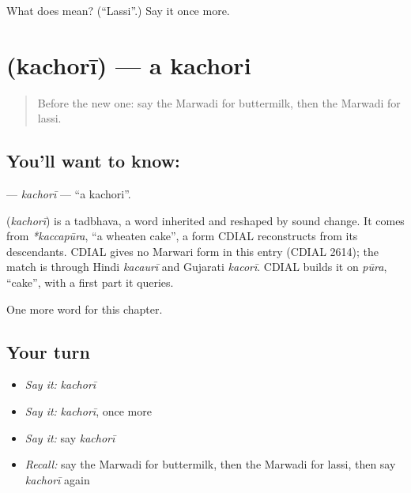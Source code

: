 \begin{tcolorbox}[breakable,colback=teal!4,colframe=teal!35!black,title={Before you move on}]
What does  mean? (\textquotedblleft{}Lassi\textquotedblright{}.) Say it once more.
\end{tcolorbox}
\section[\texorpdfstring{\mw{कचोरी} (kachorī)}{कचोरी (kachorī)}]{ (kachorī) — a kachori}

\label{lesson:MW-C134-kachori}



\begin{quote}
Before the new one: say the Marwadi for buttermilk, then the Marwadi for lassi.
\end{quote}

\subsection*{You'll want to know: }
\textbf{} — \emph{kachorī} — \textquotedblleft{}a kachori\textquotedblright{}.

\begin{cousinweb}
\textbf{} (\emph{kachorī}) is a tadbhava, a word inherited and reshaped by sound change. It comes from \emph{*kaccapūra}, \textquotedblleft{}a wheaten cake\textquotedblright{}, a form CDIAL reconstructs from its descendants. CDIAL gives no Marwari form in this entry (CDIAL 2614); the match is through Hindi \emph{kacaurī} and Gujarati \emph{kacorī}. CDIAL builds it on \emph{pūra}, \textquotedblleft{}cake\textquotedblright{}, with a first part it queries.
\end{cousinweb}

\begin{grammarlens}[title={What you've built}]
One more word for this chapter.
\end{grammarlens}

\subsection*{Your turn}
\begin{itemize}
\raggedright
  \item \emph{Say it:} \emph{kachorī}
  \item \emph{Say it:} \emph{kachorī}, once more
  \item \emph{Say it:} say \emph{kachorī}
  \item \emph{Recall:} say the Marwadi for buttermilk, then the Marwadi for lassi, then say \emph{kachorī} again
\end{itemize}

